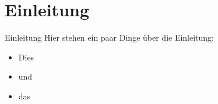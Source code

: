 \section{Einleitung}

\begin{frame}{Einleitung}
    Hier stehen ein paar Dinge \"uber die Einleitung:
    \begin{itemize}
        \item Dies
        \item und
        \item das
    \end{itemize}
\end{frame}